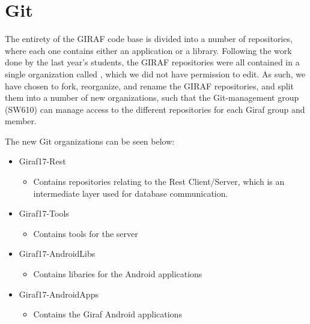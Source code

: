 \section{Git}\label{GitTool}
The entirety of the GIRAF code base is divided into a number of repositories,
where each one contains either an application or a library. Following the work
done by the last year's students, the GIRAF repositories  were all contained in
a single organization called , which we did not have permission to
edit. As such, we have chosen to fork, reorganize, and rename the GIRAF
repositories, and split them into a number of new organizations, such that the
Git-management group (SW610) can manage access to the different repositories
for each Giraf group and member.



The new Git organizations can be seen below:
\begin{itemize}
	\item Giraf17-Rest
	\begin{itemize}
  		\item Contains repositories relating to the Rest Client/Server, which is an
  		intermediate layer used for database communication.
	\end{itemize}
  	\item Giraf17-Tools
  	\begin{itemize}
  		\item Contains tools for the server
	\end{itemize}
  	\item Giraf17-AndroidLibs
  	\begin{itemize}
  		\item Contains libaries for the Android applications
	\end{itemize}
  	\item Giraf17-AndroidApps
  	\begin{itemize}
  		\item Contains the Giraf Android applications 
	\end{itemize}
\end{itemize}
